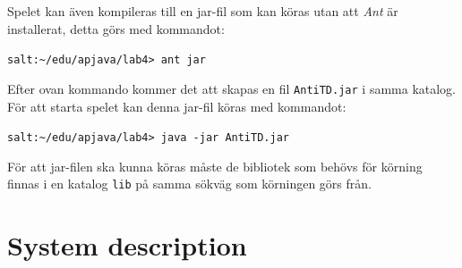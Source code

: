 \documentclass[titlepage, twocolumn, a4paper, 10pt]{article}
\begin{document}
 Spelet kan även kompileras till en jar-fil som kan köras utan att
 \textit{Ant} är installerat, detta görs med kommandot:\\
 \begin{footnotesize}
 \verb!salt:~/edu/apjava/lab4> ant jar!
 \end{footnotesize}

 Efter ovan kommando kommer det att skapas en fil \verb!AntiTD.jar! i
 samma katalog. För att starta spelet kan denna jar-fil köras med
 kommandot:\\
 \begin{footnotesize}
 \verb!salt:~/edu/apjava/lab4> java -jar AntiTD.jar!
 \end{footnotesize}

 För att jar-filen ska kunna köras måste de bibliotek som behövs för
 körning finnas i en katalog \verb!lib! på samma sökväg som körningen
 görs från.

 \section{System description}\label{sec:system}


 
\end{document}
